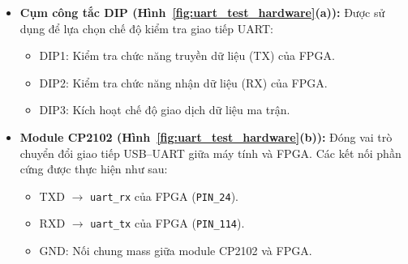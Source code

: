 \begin{itemize}
    \item \textbf{Cụm công tắc DIP 
    (Hình~\ref{fig:uart_test_hardware}(a)):}
    Được sử dụng để lựa chọn chế độ kiểm tra giao tiếp UART:
    \begin{itemize}
        \item DIP1: Kiểm tra chức năng truyền dữ liệu (TX) của FPGA.
        \item DIP2: Kiểm tra chức năng nhận dữ liệu (RX) của FPGA.
        \item DIP3: Kích hoạt chế độ giao dịch dữ liệu ma trận.
    \end{itemize}

    \item \textbf{Module CP2102 
    (Hình~\ref{fig:uart_test_hardware}(b)):}
    Đóng vai trò chuyển đổi giao tiếp USB--UART giữa máy tính 
    và FPGA. Các kết nối phần cứng được thực hiện như sau:
    \begin{itemize}
        \item TXD $\rightarrow$ \texttt{uart\_rx} 
        của FPGA (\texttt{PIN\_24}).
        \item RXD $\rightarrow$ \texttt{uart\_tx} 
        của FPGA (\texttt{PIN\_114}).
        \item GND: Nối chung mass giữa module CP2102 và FPGA.
    \end{itemize}
\end{itemize}

